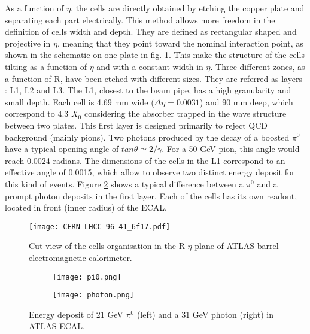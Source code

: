 As a function of $\eta$, the cells are directly obtained by etching the copper plate and separating each part electrically.
This method allows more freedom in the definition of cells width and depth.
They are defined as rectangular shaped and projective in $\eta$, meaning that they point toward the nominal interaction point, as shown in the schematic on one plate in fig. \ref{fig:org2f7ee32}.
This make the structure of the cells tilting as a function of $\eta$ and with a constant width in $\eta$.
Three different zones, as a function of R, have been etched with different sizes.
They are referred as layers : L1, L2 and L3.
The L1, closest to the beam pipe, has a high granularity and small depth.
Each cell is 4.69 mm wide ($\Delta \eta=0.0031$) and 90 mm deep,  which correspond to 4.3 $X_0$ considering the absorber trapped in the wave structure between two plates.
This first layer is designed primarily to reject QCD background (mainly pions).
Two photons produced by the decay of a boosted $\pi^0$ have a typical opening angle of $tan \theta \simeq 2/\gamma$.
For a 50 GeV pion, this angle would reach 0.0024 radians.
The dimensions of the cells in the L1 correspond to an effective angle of 0.0015, which allow to observe two distinct energy deposit for this kind of events.
Figure \ref{org248c8cf} shows a typical difference between a $\pi^0$ and a prompt photon deposits in the first layer.
Each of the cells has its own readout, located in front (inner radius) of the ECAL.

\begin{figure}[htbp]
\centering
\texttt{[image: CERN-LHCC-96-41\_6f17.pdf]}
\caption{\label{fig:org2f7ee32}
Cut view of the cells organisation in the R-$\eta$ plane of ATLAS barrel electromagnetic calorimeter.\cite{CERN-LHCC-96-41}}
\end{figure}


\begin{figure}
\begin{subfigure}[t]{0.49\linewidth}
\begin{center}
\texttt{[image: pi0.png]}
\end{center}
\end{subfigure}
\begin{subfigure}[t]{0.49\linewidth}
\begin{center}
\texttt{[image: photon.png]}
\end{center}
\end{subfigure}
\caption{\label{org248c8cf}
Energy deposit of 21 GeV $\pi^0$ (left) and a 31 GeV photon (right) in ATLAS ECAL.\cite{pi0}}
\end{figure}


